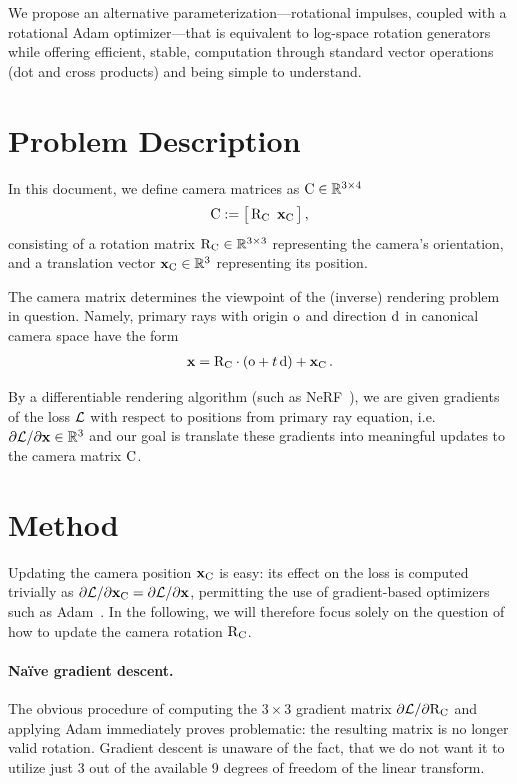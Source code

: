 \documentclass[acmtog,authorversion,nonacm]{acmart}
\begin{document}
We propose an alternative parameterization---rotational impulses, coupled with a rotational Adam optimizer---that is equivalent to log-space rotation generators while offering efficient, stable, computation through standard vector operations (dot and cross products) and being simple to understand.

\section{Problem Description} \label{Sec:ProblemDescription}

In this document, we define camera matrices as $\mathrm{C} \in \mathbb{R}^{3\times4}$
\begin{align}
  \mathrm{C} := \bigl[ \, \mathrm{R}_{\mathrm{C}} \,\,\, \mathbf{x}_{\mathrm{C}} \, \bigl] \,,
\end{align}
consisting of a rotation matrix $\mathrm{R}_{\mathrm{C}} \in \mathbb{R}^{3\times3}$ representing the camera's orientation, and a translation vector $\mathbf{x}_{\mathrm{C}} \in \mathbb{R}^3$ representing its position.

The camera matrix determines the viewpoint of the (inverse) rendering problem in question.
Namely, primary rays with origin $\mathrm{o}$ and direction $\mathrm{d}$ in canonical camera space have the form
\begin{align}
  \mathbf{x} = \mathrm{R}_{\mathrm{C}} \cdot ( \mathrm{o} + t \, \mathrm{d} ) + \mathbf{x}_{\mathrm{C}} \,.
\end{align}

By a differentiable rendering algorithm (such as NeRF~\citep{mildenhall2020nerf}), we are given gradients of the loss $\mathcal{L}$ with respect to positions from primary ray equation, i.e.\ $\partial{\mathcal{L}} / \partial{\mathbf{x}} \in \mathbb{R}^3$ and our goal is translate these gradients into meaningful updates to the camera matrix $\mathrm{C}$.


\section{Method} \label{Sec:Method}

Updating the camera position $\mathbf{x}_{\mathrm{C}}$ is easy: its effect on the loss is computed trivially as ${\partial{\mathcal{L}} / \partial{\mathbf{x}_{\mathrm{C}}} = \partial{\mathcal{L}} / \partial{\mathbf{x}}}$, permitting the use of gradient-based optimizers such as Adam~\citep{KingmaB14}.
In the following, we will therefore focus solely on the question of how to update the camera rotation $\mathrm{R}_{\mathrm{C}}$.

\paragraph{Na{\"i}ve gradient descent.}
The obvious procedure of computing the ${3\!\times\!3}$ gradient matrix ${\partial{\mathcal{L}} / \partial{\mathrm{R}_{\mathrm{C}}}}$ and applying Adam immediately proves problematic: the resulting matrix is no longer valid rotation.
Gradient descent is unaware of the fact, that we do not want it to utilize just 3 out of the available 9 degrees of freedom of the linear transform.
\end{document}
